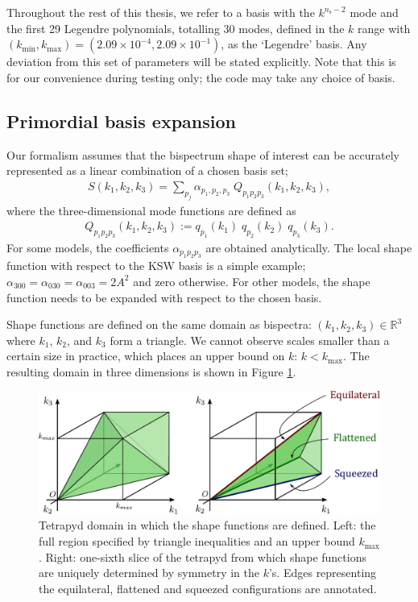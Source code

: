 Throughout the rest of this thesis, we refer to a basis with the $k^{n_\text{s} - 2}$ mode and the first 29 Legendre polynomials, totalling 30 modes, defined in the $k$ range with $(k_\text{min}, k_\text{max}) = (2.09 \times 10^{-4}, 2.09 \times 10^{-1})$, as the `Legendre' basis. Any deviation from this set of parameters will be stated explicitly. Note that this is for our convenience during testing only; the code may take any choice of basis.


\subsection{Primordial basis expansion} \label{section:primordial_basis_expansion}

Our formalism assumes that the bispectrum shape of interest can be accurately represented as a linear combination of a chosen basis set; 
\begin{align}
	S(k_1,k_2,k_3) = \sum_{p_j} \alpha_{p_1,p_2,p_3} \; Q_{p_1 p_2 p_3}(k_1, k_2, k_3),
\end{align}
where the three-dimensional mode functions are defined as
\begin{align}
	Q_{p_1 p_2 p_3} (k_1, k_2, k_3) := q_{p_1}(k_1) \; q_{p_2}(k_2) \; q_{p_3}(k_3).
\end{align}
For some models, the coefficients $\alpha_{p_1 p_2 p_3}$ are obtained analytically. The local shape function with respect to the KSW basis is a simple example; $\alpha_{300}=\alpha_{030}=\alpha_{003}=2A^2$ and zero otherwise. For other models, the shape function needs to be expanded with respect to the chosen basis. 

Shape functions are defined on the same domain as bispectra: $(k_1,k_2,k_3) \in \mathbb{R}^3$ where $k_1$, $k_2$, and $k_3$ form a triangle. We cannot observe scales smaller than a certain size in practice, which places an upper bound on $k$: $k < k_\text{max}$. The resulting domain in three dimensions is shown in Figure \ref{fig:tetrapyd}.

\begin{figure}[htbp!] 
	\centering    
	\hspace{10pt}
	\includegraphics[width=1.0\textwidth]{tetrapyd.pdf}
	\caption{Tetrapyd domain in which the shape functions are defined. Left: the full region specified by triangle inequalities and an upper bound $k_\text{max}$. Right: one-sixth slice of the tetrapyd from which shape functions are uniquely determined by symmetry in the $k$'s. Edges representing the equilateral, flattened and squeezed configurations are annotated.}
	\label{fig:tetrapyd}
\end{figure}

